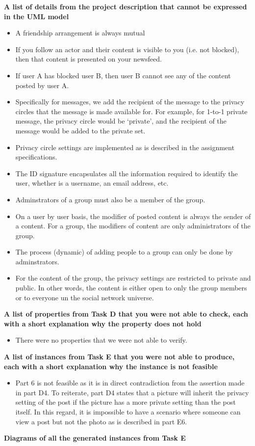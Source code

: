 {\bf A list of details from the project description that cannot be expressed in the UML model}
\begin{itemize}
  \item A friendship arrangement is always mutual
  \item If you follow an actor and their content is visible to you (i.e. not blocked), then that content is presented on your newsfeed.
  \item If user A has blocked user B, then user B cannot see any of the content posted by user A.
  \item Specifically for messages, we add the recipient of the message to the privacy circles that the message is made available for.  For example, for 1-to-1 private message, the privacy circle would be `private', and the recipient of the message would be added to the private set.
  \item Privacy circle settings are implemented as is described in the assignment specifications.
  \item The ID signature encapsulates all the information required to identify the user, whether is a username, an email address, etc.
  \item Adminstrators of a group must also be a member of the group.
  \item On a user by user basis, the modifier of posted content is always the sender of a content. For a group, the modifiers of content are only administrators of the group.
  \item The process (dynamic) of adding people to a group can only be done by adminstrators.
  \item For the content of the group, the privacy settings are restricted to private and public. In other words, the content is either open to only the group members or to everyone un the social network universe.
\end{itemize}


{\bf A list of properties from Task D that you were not able to check, each with a short explanation why the property does not hold }
\begin{itemize}
  \item There were no properties that we were not able to verify.
\end{itemize}

{\bf A list of instances from Task E that you were not able to produce, each with a short explanation why the instance is not feasible } 

\begin{itemize}
  \item Part 6 is not feasible as it is in direct contradiction from the assertion made in part D4. To reiterate, part D4 states that a picture will inherit the privacy setting of the post if the picture has a more private setting than the post itself. In this regard, it is impossible to have a scenario where someone can view a post but not the photo as is described in part E6.

\end{itemize}

{\bf Diagrams of all the generated instances from Task E}



